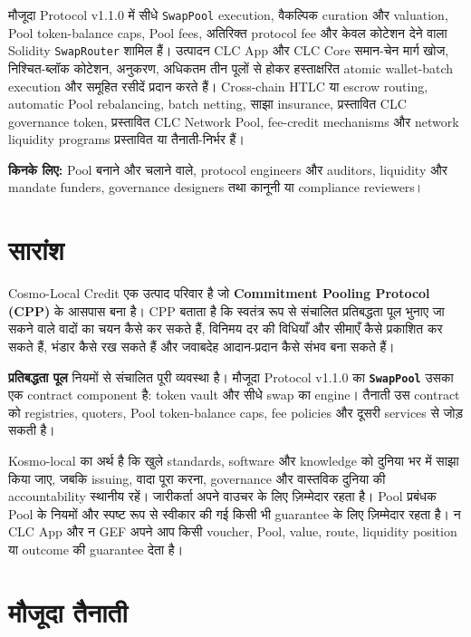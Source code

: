\documentclass[11pt]{article}
\begin{document}
मौजूदा Protocol v1.1.0 में सीधे \texttt{SwapPool} execution, वैकल्पिक curation और valuation, Pool token-balance caps, Pool fees, अतिरिक्त protocol fee और केवल कोटेशन देने वाला Solidity \texttt{SwapRouter} शामिल हैं। उत्पादन CLC App और CLC Core समान-चेन मार्ग खोज, निश्चित-ब्लॉक कोटेशन, अनुकरण, अधिकतम तीन पूलों से होकर हस्ताक्षरित atomic wallet-batch execution और समूहित रसीदें प्रदान करते हैं। Cross-chain HTLC या escrow routing, automatic Pool rebalancing, batch netting, साझा insurance, प्रस्तावित CLC governance token, प्रस्तावित CLC Network Pool, fee-credit mechanisms और network liquidity programs प्रस्तावित या तैनाती-निर्भर हैं।

\textbf{किनके लिए:} Pool बनाने और चलाने वाले, protocol engineers और auditors, liquidity और mandate funders, governance designers तथा कानूनी या compliance reviewers।

\section*{सारांश}

Cosmo-Local Credit एक उत्पाद परिवार है जो \textbf{Commitment Pooling Protocol (CPP)} के आसपास बना है। CPP बताता है कि स्वतंत्र रूप से संचालित प्रतिबद्धता पूल भुनाए जा सकने वाले वादों का चयन कैसे कर सकते हैं, विनिमय दर की विधियाँ और सीमाएँ कैसे प्रकाशित कर सकते हैं, भंडार कैसे रख सकते हैं और जवाबदेह आदान-प्रदान कैसे संभव बना सकते हैं।

\textbf{प्रतिबद्धता पूल} नियमों से संचालित पूरी व्यवस्था है। मौजूदा Protocol v1.1.0 का \textbf{\texttt{SwapPool}} उसका एक contract component है: token vault और सीधे swap का engine। तैनाती उस contract को registries, quoters, Pool token-balance caps, fee policies और दूसरी services से जोड़ सकती है।

Kosmo-local का अर्थ है कि खुले standards, software और knowledge को दुनिया भर में साझा किया जाए, जबकि issuing, वादा पूरा करना, governance और वास्तविक दुनिया की accountability स्थानीय रहें। जारीकर्ता अपने वाउचर के लिए ज़िम्मेदार रहता है। Pool प्रबंधक Pool के नियमों और स्पष्ट रूप से स्वीकार की गई किसी भी guarantee के लिए ज़िम्मेदार रहता है। न CLC App और न GEF अपने आप किसी voucher, Pool, value, route, liquidity position या outcome की guarantee देता है।

\section*{मौजूदा तैनाती}
\end{document}
